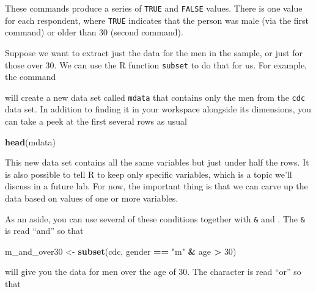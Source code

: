 \documentclass[]{book}
\newenvironment{Shaded}{\begin{snugshade}}{\end{snugshade}}
\newcommand{\DecValTok}[1]{\textcolor[rgb]{0.00,0.00,0.81}{#1}}
\newcommand{\KeywordTok}[1]{\textcolor[rgb]{0.13,0.29,0.53}{\textbf{#1}}}
\newcommand{\NormalTok}[1]{#1}
\newcommand{\OperatorTok}[1]{\textcolor[rgb]{0.81,0.36,0.00}{\textbf{#1}}}
\newcommand{\StringTok}[1]{\textcolor[rgb]{0.31,0.60,0.02}{#1}}
\theoremstyle{definition}
\theoremstyle{definition}
\theoremstyle{definition}
\theoremstyle{remark}
\begin{document}
These commands produce a series of \texttt{TRUE} and \texttt{FALSE}
values. There is one value for each respondent, where \texttt{TRUE}
indicates that the person was male (via the first command) or older than
30 (second command).

Suppose we want to extract just the data for the men in the sample, or
just for those over 30. We can use the R function \texttt{subset} to do
that for us. For example, the command

\begin{Shaded}
\end{Shaded}

will create a new data set called \texttt{mdata} that contains only the
men from the \texttt{cdc} data set. In addition to finding it in your
workspace alongside its dimensions, you can take a peek at the first
several rows as usual

\begin{Shaded}
\begin{Highlighting}[]
\KeywordTok{head}\NormalTok{(mdata)}
\end{Highlighting}
\end{Shaded}

This new data set contains all the same variables but just under half
the rows. It is also possible to tell R to keep only specific variables,
which is a topic we'll discuss in a future lab. For now, the important
thing is that we can carve up the data based on values of one or more
variables.

As an aside, you can use several of these conditions together with
\texttt{\&} and \texttt{\textbar{}}. The \texttt{\&} is read ``and'' so
that

\begin{Shaded}
\begin{Highlighting}[]
\NormalTok{m_and_over30 <-}\StringTok{ }\KeywordTok{subset}\NormalTok{(cdc, gender }\OperatorTok{==}\StringTok{ "m"} \OperatorTok{&}\StringTok{ }\NormalTok{age }\OperatorTok{>}\StringTok{ }\DecValTok{30}\NormalTok{)}
\end{Highlighting}
\end{Shaded}

will give you the data for men over the age of 30. The
\texttt{\textbar{}} character is read ``or'' so that
\end{document}
